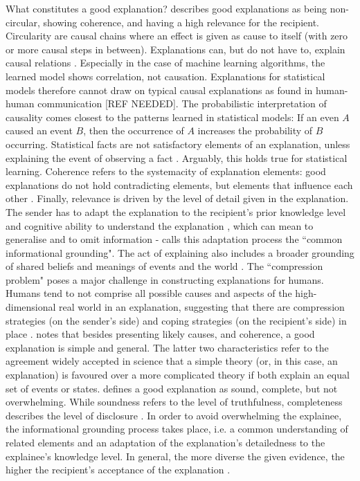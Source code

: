 What constitutes a good explanation? \cite{keil2006explanation} describes good explanations as being non-circular, showing coherence, and having a high relevance for the recipient. Circularity are causal chains where an effect is given as cause to itself (with zero or more causal steps in between). Explanations can, but do not have to, explain causal relations \cite{keil2006explanation}. Especially in the case of machine learning algorithms, the learned model shows correlation, not causation. Explanations for statistical models therefore cannot draw on typical causal explanations as found in human-human communication {\color{red}[REF NEEDED]}. The probabilistic interpretation of causality comes closest to the patterns learned in statistical models: If an even $A$ caused an event $B$, then the occurrence of $A$ increases the probability of $B$ occurring. Statistical facts are not satisfactory elements of an explanation, unless explaining the event of observing a fact \cite{miller2017explanation}. Arguably, this holds true for statistical learning. Coherence refers to the systemacity of explanation elements: good explanations do not hold contradicting elements, but elements that influence each other \cite{keil2006explanation}. Finally, relevance is driven by the level of detail given in the explanation. The sender has to adapt the explanation to the recipient's prior knowledge level and cognitive ability to understand the explanation \cite{miller2017explanation}, which can mean to generalise and to omit information - \cite{keil2006explanation} calls this adaptation process the ``common informational grounding". The act of explaining also includes a broader grounding of shared beliefs and meanings of events and the world \cite{miller2017explanation}. The ``compression problem" poses a major challenge in constructing explanations for humans. Humans tend to not comprise all possible causes and aspects of the high-dimensional real world in an explanation, suggesting that there are compression strategies (on the sender's side) and coping strategies (on the recipient's side) in place \cite{keil2006explanation}. \newline
\cite{miller2017explanation} notes that besides presenting likely causes, and coherence, a good explanation is simple and general. The latter two characteristics refer to the agreement widely accepted in science that a simple theory (or, in this case, an explanation) is favoured over a more complicated theory if both explain an equal set of events or states.\newline
\cite{kulesza2013too} defines a good explanation as sound, complete, but not overwhelming. While soundness refers to the level of truthfulness, completeness describes the level of disclosure \cite{kulesza2013too}. In order to avoid overwhelming the explainee, the informational grounding process takes place, i.e. a common understanding of related elements and an adaptation of the explanation's detailedness to the explainee's knowledge level. In general, the more diverse the given evidence, the higher the recipient's acceptance of the explanation \cite{keil2006explanation}.\newline
